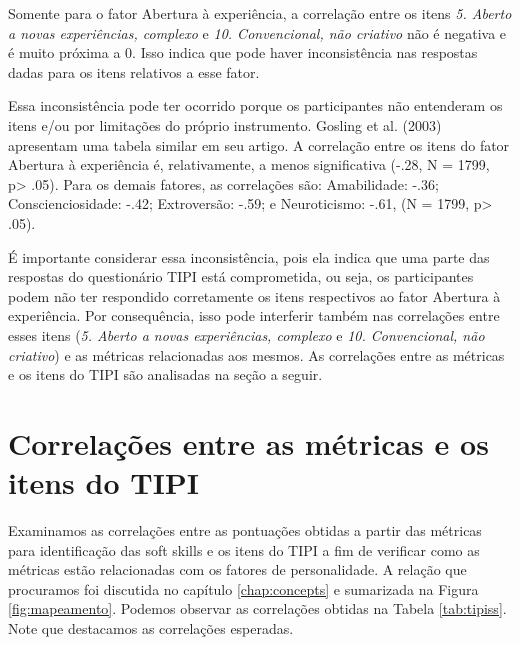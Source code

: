 Somente para o fator Abertura à experiência, a correlação entre os itens \textit{5. Aberto a novas experiências, complexo} e \textit{10. Convencional, não criativo} não é negativa e é muito próxima a 0. Isso indica que pode haver inconsistência nas respostas dadas para os itens relativos a esse fator.

Essa inconsistência pode ter ocorrido porque os participantes não entenderam os itens e/ou por limitações do próprio instrumento. Gosling et al. (2003)\nocite{gosling:03} apresentam uma tabela similar em seu artigo. A correlação entre os itens do fator Abertura à experiência é, relativamente, a menos significativa (-.28, N = 1799, p> .05).
Para os demais fatores, as correlações são: Amabilidade: -.36; Conscienciosidade: -.42; Extroversão: -.59; e Neuroticismo: -.61, (N = 1799, p> .05).

É importante considerar essa inconsistência, pois ela indica que uma parte das respostas do questionário TIPI está comprometida, ou seja, os participantes podem não ter respondido corretamente os itens respectivos ao fator Abertura à experiência. Por consequência, isso pode interferir também nas correlações entre esses itens (\textit{5. Aberto a novas experiências, complexo} e \textit{10. Convencional, não criativo}) e as métricas relacionadas aos mesmos.
As correlações entre as métricas e os itens do TIPI são analisadas na seção a seguir.

\section{Correlações entre as métricas e os itens do TIPI}
\label{sec:tipiss}

Examinamos as correlações entre as pontuações obtidas a partir das métricas para identificação das soft skills e os itens do TIPI a fim de verificar como as métricas estão relacionadas com os fatores de personalidade. A relação que procuramos foi discutida no capítulo \ref{chap:concepts} e sumarizada na Figura \ref{fig:mapeamento}.
Podemos observar as correlações obtidas na Tabela \ref{tab:tipiss}. Note que destacamos as correlações esperadas. 

